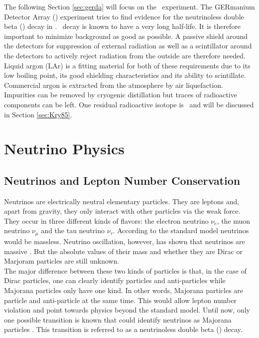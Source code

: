 \documentclass[encoding=utf8,british]{tumphthesis}
\begin{document}
The following Section \ref{sec:gerda} will focus on the \gerda\ experiment.
The GERmanium Detector Array (\gerda) experiment tries to find evidence for the neutrinoless double beta (\onbb) decay in  \cite{agostini_background_2017}.
\onbb\ decay is known to have a very long half-life.
It is therefore important to minimize background as good as possible. 
A passive shield around the detectors for suppression of external radiation as well as a scintillator around the detectors to actively reject radiation from the outside are therefore needed.
Liquid argon (LAr) is a fitting material for both of these requirements due to its low boiling point, its good shielding characteristics and its ability to scintillate. 
Commercial argon is extracted from the atmosphere by air liquefaction. 
Impurities can be removed by cryogenic distillation but traces of radioactive components can be left.
One residual radioactive isotope is \Kr\ and  will be discussed in Section \ref{sec:Kry85}. 
\\


\section{Neutrino Physics}
\label{sec:PhyBG}

\subsection{Neutrinos and Lepton Number Conservation}

Neutrinos are electrically neutral elementary particles.
They are leptons and, apart from gravity, they only interact with other particles via the weak force.
They occur in three different kinds of flavors: the electron neutrino $\nu_e$, the muon neutrino $\nu_{\mu}$ and the tau neutrino $\nu_{\tau}$.
According to the standard model neutrinos would be massless.
Neutrino oscillation, however, has shown that neutrinos are massive \cite{fukuda_evidence_1998,sno_collaboration_direct_2002}.
But the absolute values of their mass and whether they are Dirac or Marjoram particles are still unknown. 
\\

The major difference between these two kinds of particles is that, in the case of Dirac particles, one can clearly identify particles and anti-particles while Majorana particles only have one kind.
In other words, Majorana particles are particle and anti-particle at the same time.
This would allow lepton number violation and point towards physics beyond the standard model.
Until now, only one possible transition is known that could identify neutrinos as Majorana particles \cite{schechter_neutrinoless_1982}.
This transition is referred to as a neutrinoless double beta (\onbb) decay. 
 
\end{document}

